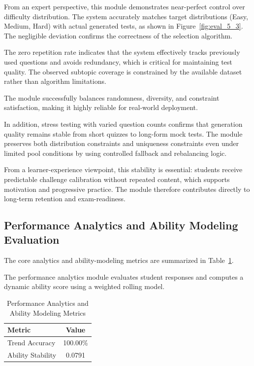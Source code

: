 \begin{sloppypar}
From an expert perspective, this module demonstrates near-perfect control over difficulty distribution. The system accurately matches target distributions (Easy, Medium, Hard) with actual generated tests, as shown in Figure~\ref{fig:eval_5_3}. The negligible deviation confirms the correctness of the selection algorithm.

The zero repetition rate indicates that the system effectively tracks previously used questions and avoids redundancy, which is critical for maintaining test quality. The observed subtopic coverage is constrained by the available dataset rather than algorithm limitations.

The module successfully balances randomness, diversity, and constraint satisfaction, making it highly reliable for real-world deployment.

In addition, stress testing with varied question counts confirms that generation quality remains stable from short quizzes to long-form mock tests. The module preserves both distribution constraints and uniqueness constraints even under limited pool conditions by using controlled fallback and rebalancing logic.

From a learner-experience viewpoint, this stability is essential: students receive predictable challenge calibration without repeated content, which supports motivation and progressive practice. The module therefore contributes directly to long-term retention and exam-readiness.

\subsection{Performance Analytics and Ability Modeling Evaluation}

The core analytics and ability-modeling metrics are summarized in Table~\ref{tab:performance_analytics_metrics}.

The performance analytics module evaluates student responses and computes a dynamic ability score using a weighted rolling model.

\begin{table}[H]
\centering
\caption{Performance Analytics and Ability Modeling Metrics}
\label{tab:performance_analytics_metrics}
\begin{tabular}{|l|c|}
\hline
Metric & Value \\
\hline
Trend Accuracy & 100.00\% \\
\hline
Ability Stability & 0.0791 \\
\hline
\end{tabular}
\end{table}


\end{sloppypar}
